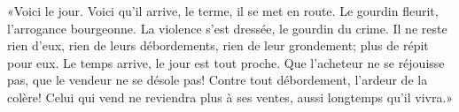 «Voici le jour. Voici qu’il arrive, le terme, il se met en route.
	Le gourdin fleurit, l’arrogance bourgeonne.
La violence s’est dressée, le gourdin du crime.
	Il ne reste rien d’eux, rien de leurs débordements,
	rien de leur grondement; plus de répit pour eux.
Le temps arrive, le jour est tout proche.
Que l’acheteur ne se réjouisse pas, que le vendeur ne se désole pas!
	Contre tout débordement, l’ardeur de la colère!
	Celui qui vend ne reviendra plus à ses ventes, aussi longtemps qu’il vivra.»
